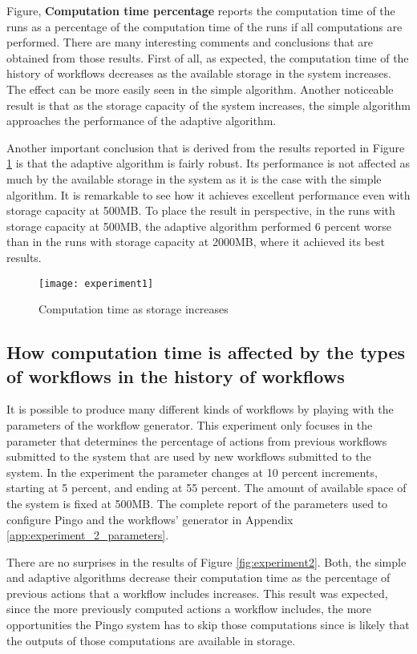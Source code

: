 Figure, \textbf{Computation time percentage} reports the computation time of the runs as a percentage of the computation time of the runs if all computations are performed. There are many interesting comments and conclusions that are obtained from those results. First of all, as expected, the computation time of the history of workflows decreases as the available storage in the system increases.  The effect can be more easily seen in the simple algorithm.  Another noticeable result is that as the storage capacity of the system increases, the simple algorithm approaches the performance of the adaptive algorithm.

Another important conclusion that is derived from the results reported in Figure \ref{fig:experiment1} is that the adaptive algorithm is fairly robust. Its performance is not affected as much by the available storage in the system as it is the case with the simple algorithm. It is remarkable to see how it achieves excellent performance even with storage capacity at 500MB.  To place the result in perspective, in the runs with storage capacity at 500MB, the adaptive algorithm performed 6 percent worse than in the runs with storage capacity at 2000MB, where it achieved its best results.


\begin{figure}
\centering
\texttt{[image: experiment1]}
\caption{Computation time as storage increases}
\label{fig:experiment1}
\end{figure}

\subsection{How computation time is affected by the types of workflows in the history of workflows}
It is possible to produce many different kinds of workflows by playing with the parameters of the workflow generator.  This experiment only focuses in the parameter that determines the percentage of actions from previous workflows submitted to the system that are used by new workflows submitted to the system.  In the experiment the parameter changes at 10 percent increments, starting at 5 percent, and ending at 55 percent.  The amount of available space of the system is fixed at 500MB.   The complete report of the parameters used to configure Pingo and the workflows' generator in Appendix \ref{app:experiment_2_parameters}.

There are no surprises in the results of Figure \ref{fig:experiment2}.  Both, the simple and adaptive algorithms decrease their computation time as the percentage of previous actions that a workflow includes increases.  This result was expected, since the more previously computed actions a workflow includes, the more opportunities the Pingo system has to skip those computations since is likely that the outputs of those computations are available in storage.


